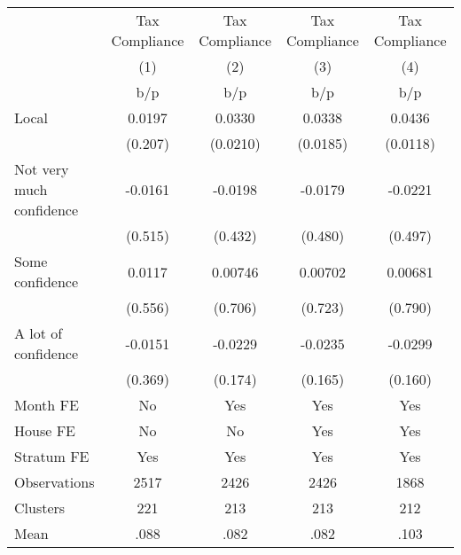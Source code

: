 {
\def\sym#1{\ifmmode^{#1}\else\(^{#1}\)\fi}
\begin{tabular}{l*{4}{c}}
\toprule
                &\multicolumn{1}{c}{Tax Compliance}&\multicolumn{1}{c}{Tax Compliance}&\multicolumn{1}{c}{Tax Compliance}&\multicolumn{1}{c}{Tax Compliance}\\
                &\multicolumn{1}{c}{(1)}&\multicolumn{1}{c}{(2)}&\multicolumn{1}{c}{(3)}&\multicolumn{1}{c}{(4)}\\
                &      b/p&      b/p&      b/p&      b/p\\
\midrule
Local           &   0.0197&   0.0330&   0.0338&   0.0436\\
                &  (0.207)& (0.0210)& (0.0185)& (0.0118)\\
Not very much confidence&  -0.0161&  -0.0198&  -0.0179&  -0.0221\\
                &  (0.515)&  (0.432)&  (0.480)&  (0.497)\\
Some confidence &   0.0117&  0.00746&  0.00702&  0.00681\\
                &  (0.556)&  (0.706)&  (0.723)&  (0.790)\\
A lot of confidence&  -0.0151&  -0.0229&  -0.0235&  -0.0299\\
                &  (0.369)&  (0.174)&  (0.165)&  (0.160)\\
Month FE        &       No&      Yes&      Yes&      Yes\\
House FE        &       No&       No&      Yes&      Yes\\
Stratum FE      &      Yes&      Yes&      Yes&      Yes\\
\midrule
Observations    &     2517&     2426&     2426&     1868\\
Clusters        &      221&      213&      213&      212\\
Mean            &     .088&     .082&     .082&     .103\\
\bottomrule
\end{tabular}
}
